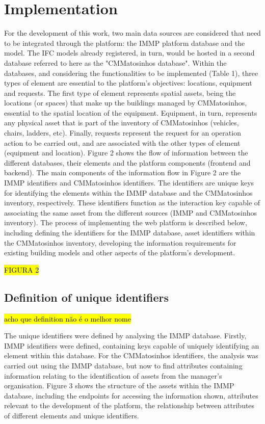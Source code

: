 \section{Implementation}
\label{sec:implementation}

For the development of this work, two main data sources are considered that need to be integrated through the platform: the IMMP platform database and the model. The IFC models already registered, in turn, would be hosted in a second database referred to here as the "CMMatosinhos database". Within the databases, and considering the functionalities to be implemented (Table 1), three types of element are essential to the platform's objectives: locations, equipment and requests. The first type of element represents spatial assets, being the locations (or spaces) that make up the buildings managed by CMMatosinhos, essential to the spatial location of the equipment. Equipment, in turn, represents any physical asset that is part of the inventory of CMMatosinhos (vehicles, chairs, ladders, etc). Finally, requests represent the request for an operation action to be carried out, and are associated with the other types of element (equipment and location). Figure 2 shows the flow of information between the different databases, their elements and the platform components (frontend and backend). The main components of the information flow in Figure 2 are the IMMP identifiers and CMMatosinhos identifiers. The identifiers are unique keys for identifying the elements within the IMMP database and the CMMatosinhos inventory, respectively. These identifiers function as the interaction key capable of associating the same asset from the different sources (IMMP and CMMatosinhos inventory). The process of implementing the web platform is described below, including defining the identifiers for the IMMP database, asset identifiers within the CMMatosinhos inventory, developing the information requirements for existing building models and other aspects of the platform's development.

\hl{FIGURA 2}

\subsection{Definition of unique identifiers}
\label{subsec:identifiers}
\hl{acho que definition não é o melhor nome}

The unique identifiers were defined by analysing the IMMP database. Firstly, IMMP identifiers were defined, containing keys capable of uniquely identifying an element within this database. For the CMMatosinhos identifiers, the analysis was carried out using the IMMP database, but now to find attributes containing information relating to the identification of assets from the manager's organisation. Figure 3 shows the structure of the assets within the IMMP database, including the endpoints for accessing the information shown, attributes relevant to the development of the platform, the relationship between attributes of different elements and unique identifiers.

